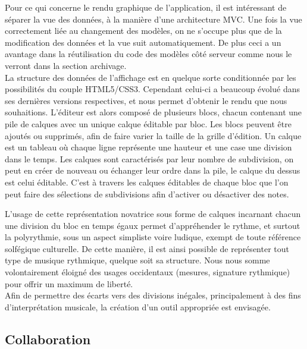 \documentclass[12pt,a4paper]{article}
\begin{document}
Pour ce qui concerne le rendu graphique de l’application, il est intéressant de séparer la vue des données, à la manière d’une architecture MVC. Une fois la vue correctement liée au changement des modèles, on ne s’occupe plus que de la modification des données et la vue suit automatiquement. De plus ceci a un avantage dans la réutilisation du code des modèles côté serveur comme nous le verront dans la section archivage.\\
La structure des données de l’affichage est en quelque sorte conditionnée par les possibilités du couple HTML5/CSS3. Cependant celui-ci a beaucoup évolué dans ses dernières versions respectives, et nous permet d’obtenir le rendu que nous souhaitions. L’éditeur est alors composé de plusieurs blocs, chacun contenant une pile de calques avec un unique calque éditable par bloc. Les blocs peuvent être ajoutés ou supprimés, afin de faire varier la taille de la grille d’édition. Un calque est un tableau où chaque ligne représente une hauteur et une case une division dans le temps. Les calques sont caractérisés par leur nombre de subdivision, on peut en créer de nouveau ou échanger leur ordre dans la pile, le calque du dessus est celui éditable. C’est à travers les calques éditables de chaque bloc que l’on peut faire des sélections de subdivisions afin d’activer ou désactiver des notes.

\bigskip
L’usage de cette représentation novatrice sous forme de calques incarnant chacun une division du bloc en temps égaux permet d’appréhender le rythme, et surtout la polyrythmie, sous un aspect simpliste voire ludique, exempt de toute référence solfégique culturelle. De cette manière, il est ainsi possible de représenter tout type de musique rythmique, quelque soit sa structure. Nous nous somme volontairement éloigné des usages occidentaux (mesures, signature rythmique) pour offrir un maximum de liberté.\\
Afin de permettre des écarts vers des divisions inégales, principalement à des fins d’interprétation musicale, la création d’un outil appropriée est envisagée.

\subsection{Collaboration}
\end{document}
